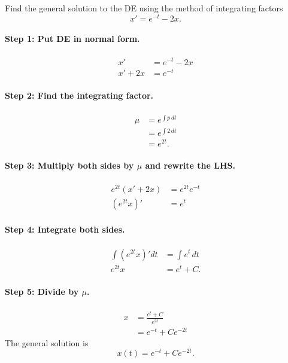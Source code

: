 \documentclass[09pt,letterpaper]{article}
\begin{document}
\begin{example}[1]{    
Find the general solution to the DE using the method of integrating factors 
\[
x' = e^{-t}-2x.
\]
}
\paragraph{Step 1: Put DE in normal form.}
\begin{align*}
x' &= e^{-t}-2x\\
x' + 2x &= e^{-t}
\end{align*}

\paragraph{Step 2: Find the integrating factor.}

\begin{align*}
\mu &= e^{\int p \,dt}\\
    &= e^{\int 2\,dt}\\
    &= e^{2t}.
\end{align*}

\paragraph{Step 3: Multiply both sides by $\mu$ and rewrite the LHS.}
\begin{align*}    
e^{2t}(x' + 2x )&= e^{2t}e^{-t}\\
(e^{2t}x)' &= e^{t}
\end{align*}

\paragraph{Step 4: Integrate both sides.}
\begin{align*}    
\int (e^{2t}x)'dt &= \int e^{t}\,dt\\
e^{2t}x &=e^{t} + C.
\end{align*}

\paragraph{Step 5: Divide by $\mu$.}
\begin{align*}
    x &= \frac{e^t +C}{e^{2t}}\\
      &= e^{-t} + Ce^{-2t}
\end{align*}
The general solution is
\[
\boxed{
x(t) = e^{-t} + C e^{-2t}.
}
\]
\end{example}
\end{document}
